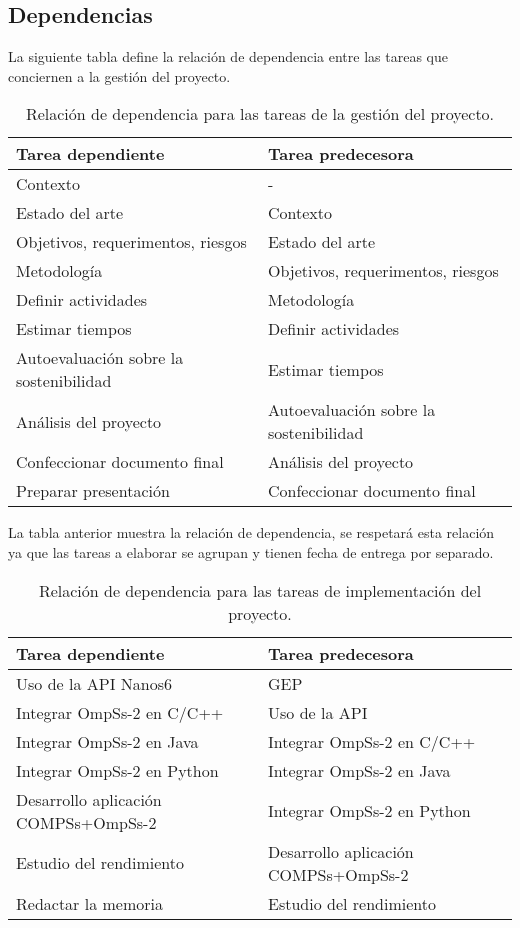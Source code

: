\subsection{Dependencias}

La siguiente tabla define la relación de dependencia entre las tareas que conciernen a la gestión del proyecto.

\begin{table}[H]
\centering
 \begin{tabular}{|| l | l ||}
    \hline  
    Tarea dependiente & Tarea predecesora \\
    \hline\hline
    Contexto & - \\
    \hline
    Estado del arte & Contexto \\
    \hline
    Objetivos, requerimentos, riesgos & Estado del arte \\
    \hline
    Metodología & Objetivos, requerimentos, riesgos \\
    \hline
    Definir actividades & Metodología \\
    \hline
    Estimar tiempos & Definir actividades \\
    \hline
    Autoevaluación sobre la sostenibilidad & Estimar tiempos \\
    \hline
    Análisis del proyecto & Autoevaluación sobre la sostenibilidad \\
    \hline
    Confeccionar documento final & Análisis del proyecto \\
    \hline
    Preparar presentación & Confeccionar documento final \\
    \hline
 \end{tabular}
 \caption{Relación de dependencia para las tareas de la gestión del proyecto.}
 \label{table:1}
\end{table}

La tabla anterior muestra la relación de dependencia, se respetará esta relación ya que las tareas a elaborar se agrupan y tienen fecha de entrega por separado. 

\begin{table}[H]
 \centering
 \begin{tabular}{|| l | l ||}
    \hline  
    Tarea dependiente & Tarea predecesora \\
    \hline\hline
    Uso de la API Nanos6 & GEP \\
    \hline
    Integrar OmpSs-2 en C/C++ & Uso de la API \\
    \hline
    Integrar OmpSs-2 en Java & Integrar OmpSs-2 en C/C++ \\
    \hline
    Integrar OmpSs-2 en Python & Integrar OmpSs-2 en Java \\
    \hline
    Desarrollo aplicación COMPSs+OmpSs-2 & Integrar OmpSs-2 en Python \\
    \hline
    Estudio del rendimiento & Desarrollo aplicación COMPSs+OmpSs-2 \\
    \hline
    Redactar la memoria & Estudio del rendimiento \\
    \hline
 \end{tabular}
    \caption{Relación de dependencia para las tareas de implementación del proyecto.}
    \label{table:2}
\end{table}

